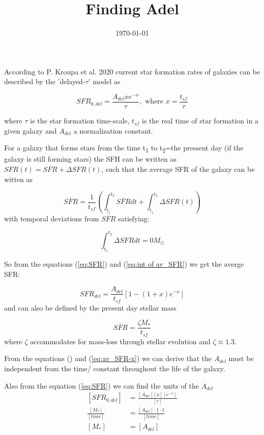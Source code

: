 \documentclass[a4paper,twocolumn]{article}
\date{\today}
\title{Finding Adel}
\begin{document}
\maketitle
According to P. Kroupa et al. 2020\autocite{kroupaConstraintsStarFormation2020} current star formation rates of galaxies can be described by the 'delayed-\(\tau\)' model as


\begin{equation} \label{eq:SFR}
SFR_{0,del}=\frac{A_{del}xe^{-x}}{\tau},\text{ where } x=\frac{t_{sf}}{\tau}
\end{equation}

\noindent
where \(\tau\) is the star formation time-scale,  \(t_{sf}\) is the real time of star formation in a given galaxy and \(A_{del}\) a normalization constant.

For a galaxy that forms stars from the time t\textsubscript{1} to t\textsubscript{2}=the pressent day (if the galaxy is still forming stars) the SFH can be written as \(SFR(t) = \overline{SFR}+\Delta SFR(t)\), such that the average SFR of the galaxy can be witten as

\begin{equation}\label{eq:int of av_SFR}
\overline{SFR} = \frac{1}{t_{sf}} \left(\int^{t_2}_{t_1}\overline{SFR}dt+ \int^{t_2}_{t_1}\Delta SFR(t)\right)
\end{equation}
with temporal deviations from \(\overline{SFR}\) satisfying:

$$\int^{t_2}_{t_1} \Delta SFR dt = 0M_\odot$$

So from the equations (\ref{eq:SFR}) and (\ref{eq:int of av_SFR}) we get the averge SFR:

\begin{equation}\label{eq:av_SFR-x}
\overline{SFR_{del}}=\frac{A_{del}}{t_{sf}}[1-(1+x)e^{-x}]
\end{equation}
and can also be defined by the present day stellar mass

\begin{equation}\label{eq:av_SFR M*}
    \overline{SFR}=\frac{\zeta M_*}{t_{sf}}
\end{equation}
\noindent where \(\zeta\) accommodates for mass-loss through stellar evolution and \(\zeta\approx 1.3\).

From the equations () and (\ref{eq:av_SFR-x}) we can derive that the \(A_{del}\) must be independent from the time/ constant throughout the life of the galaxy.

Also from the equation (\ref{eq:SFR}) we can find the units of the \(A_{del}\)
\begin{equation} \label{eq:units}
\begin{align}
\left[SFR_{0,del}\right]&=\frac{\left[A_{del}\right]\left[x\right]\left[e^{-x}\right]}{\left[\tau\right]}\\
\frac{[M_*]}{[time]}& = \frac{[A_{del}]\cdot 1\cdot 1}{[time]}\\
[M_*]& = [A_{del}]
\end{align}
\end{equation}
\end{document}
